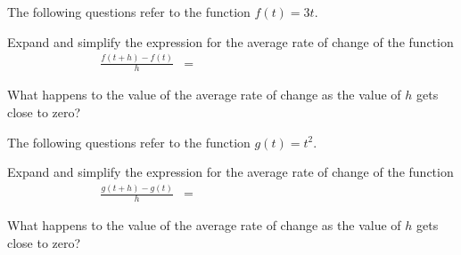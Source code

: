 \begin{problem}
  \clearpage

  \item The following questions refer to the function $f(t)=3t$.
    \begin{subproblem}
    \item Expand and simplify the expression for the average rate of
      change of the function
      \begin{eqnarray*}
        \frac{f(t+h)-f(t)}{h} & = & ~~~~~~~~~~~~~~~~~~~~~~~~~~~~~~~~~~~~~~~~~~~~~~~~~~~~~~~~~~
      \end{eqnarray*}
      \vfill
    \item What happens to the value of the average rate of change as
      the value of $h$ gets close to zero?
      \vspace{3em}
    \end{subproblem}

  \item The following questions refer to the function $g(t)=t^2$.
    \begin{subproblem}
    \item Expand and simplify the expression for the average rate of
      change of the function
      \begin{eqnarray*}
        \frac{g(t+h)-g(t)}{h} & = & ~~~~~~~~~~~~~~~~~~~~~~~~~~~~~~~~~~~~~~~~~~~~~~~~~~~~~~~~~~
      \end{eqnarray*}
      \vfill
    \item What happens to the value of the average rate of change as
      the value of $h$ gets close to zero?
      \vspace{3em}
    \end{subproblem}

\end{problem}

\postClass

